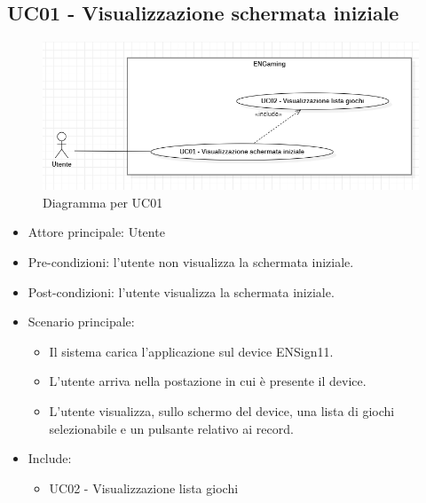 \subsection{UC01 - Visualizzazione schermata iniziale}
\begin{figure}[h]
    \centering
    \includegraphics[width=400pt]{images/usecase/UC01.png}
    \caption{Diagramma per UC01}
    \label{fig:UC01}
\end{figure}
\begin{itemize}
    \item Attore principale: Utente
    \item Pre-condizioni: l'utente non visualizza la schermata iniziale.
    \item Post-condizioni: l'utente visualizza la schermata iniziale.
    \item Scenario principale: \begin{itemize}
        \item Il sistema carica l'applicazione sul device ENSign11.
        \item L'utente arriva nella postazione in cui è presente il device.
        \item L'utente visualizza, sullo schermo del device, una lista di giochi selezionabile e un pulsante relativo ai record.
    \end{itemize}
    \item Include: \begin{itemize}
        \item UC02 - Visualizzazione lista giochi
    \end{itemize}
\end{itemize}

